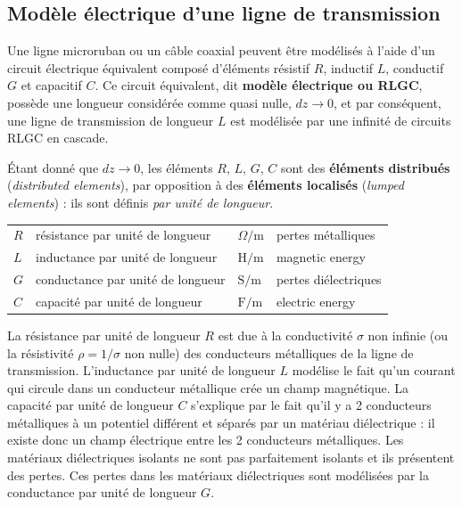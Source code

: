 \subsection{Modèle électrique d'une ligne de transmission}
Une ligne microruban ou un câble coaxial peuvent être modélisés à l'aide d'un
circuit électrique équivalent composé d'éléments résistif $R$, inductif $L$,
conductif $G$ et capacitif $C$. Ce circuit équivalent, dit \textbf{modèle
électrique ou RLGC}, possède une longueur considérée comme quasi nulle,
$dz \to 0$, et par conséquent, une ligne de transmission de longueur $L$ est
modélisée par une infinité de circuits RLGC en cascade.

\begin{notation}
  Étant donné que $dz \to 0$, les éléments $R$, $L$, $G$, $C$ sont des
  \textbf{éléments distribués} (\textit{distributed elements}), par opposition
  à des \textbf{éléments localisés} (\textit{lumped elements}) : ils sont
  définis \emph{par unité de longueur}.
  \begin{center}
    \begin{tabular}{llll}
      \toprule
      $R$ & résistance par unité de longueur  & $\Omega/\mathrm{m}$ & pertes métalliques\\
      $L$ & inductance par unité de longueur  & $\mathrm{H}/\mathrm{m}$ & magnetic energy\\
      $G$ & conductance par unité de longueur & $\mathrm{S}/\mathrm{m}$ & pertes diélectriques\\
      $C$ & capacité par unité de longueur & $\mathrm{F}/\mathrm{m}$ & electric energy\\
      \bottomrule
    \end{tabular}
  \end{center}
\end{notation}

La résistance par unité de longueur $R$ est due à la conductivité $\sigma$ non
infinie (ou la résistivité $\rho = 1/\sigma$ non nulle) des conducteurs
métalliques de la ligne de transmission. L'inductance par unité de longueur $L$
modélise le fait qu'un courant qui circule dans un conducteur métallique crée
un champ magnétique. La capacité par unité de longueur $C$ s'explique par le
fait qu'il y a 2 conducteurs métalliques à un potentiel différent et séparés
par un matériau diélectrique : il existe donc un champ électrique entre les 2
conducteurs métalliques. Les matériaux diélectriques isolants ne sont pas
parfaitement isolants et ils présentent des pertes. Ces pertes dans les
matériaux diélectriques sont modélisées par la conductance par unité de
longueur $G$.

